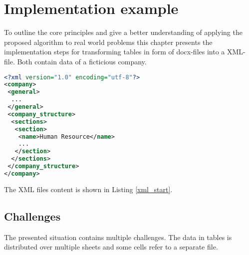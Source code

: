 \documentclass[conference]{IEEEtran}
\begin{document}
\section{Implementation example}
To outline the core principles and give a better understanding of applying the proposed algorithm
to real world problems this chapter presents the implementation steps for transforming tables in
form of docx-files into a XML-file. Both contain data of a ficticious company.
\begin{lstlisting}[language=XML,caption={Reduced \textit{source} XML file},label=xml_start]
<?xml version="1.0" encoding="utf-8"?>
<company>
 <general>
  ...
 </general>
 <company_structure>
  <sections>
   <section>
    <name>Human Resource</name>
    ...
   </section>
  </sections>
 </company_structure>
</company>
\end{lstlisting}
The XML files content is shown in Listing \ref{xml_start}.

\subsection{Challenges}
The presented situation contains multiple challenges. The data in tables is distributed over multiple
sheets and some cells refer to a separate file.

\printbibliography
\end{document}
